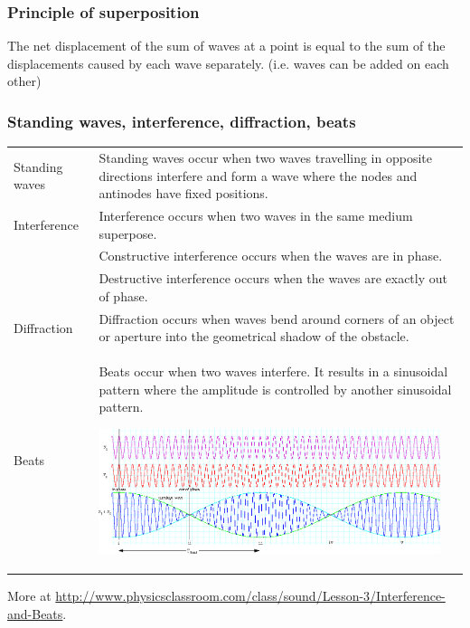 \documentclass[11pt]{article}
\numberwithin{equation}{section}
\begin{document}
			\subsubsection{Principle of superposition}
				The net displacement of the sum of waves at a point is equal to the sum of the displacements caused by each wave separately. (i.e. waves can be added on each other)
			\subsubsection{Standing waves, interference, diffraction, beats}
				\begin{center}
					\renewcommand{\arraystretch}{1.5}
					\begin{tabular}[h]{@{}l@{\hspace{2em}}p{10cm}@{}}
						\toprule
						Standing waves & Standing waves occur when two waves travelling in opposite directions interfere and form a wave where the nodes and antinodes have fixed positions. \\
						Interference & Interference occurs when two waves in the same medium superpose. \\
						&Constructive interference occurs when the waves are in phase. \\
						& Destructive interference occurs when the waves are exactly out of phase.\\
						Diffraction & Diffraction occurs when waves bend around corners of an object or aperture into the geometrical shadow of the obstacle. \\
						Beats & Beats occur when two waves interfere. It results in a sinusoidal pattern where the amplitude is controlled by another sinusoidal pattern.
						\vspace{1.5em}
						\begin{center}
							\vspace{-0.3cm}
							\includegraphics[width=10cm]{beats.png}
							\vspace{-0.8cm}
						\end{center} 
						\\
						\bottomrule
					\end{tabular}
				\end{center}
				More at \url{http://www.physicsclassroom.com/class/sound/Lesson-3/Interference-and-Beats}.
\end{document}
